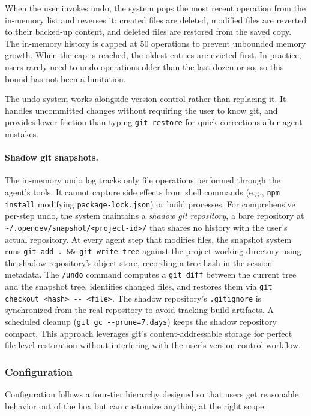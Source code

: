 When the user invokes undo, the system pops the most recent operation from the in-memory list and reverses it: created files are deleted, modified files are reverted to their backed-up content, and deleted files are restored from the saved copy. The in-memory history is capped at 50 operations to prevent unbounded memory growth. When the cap is reached, the oldest entries are evicted first. In practice, users rarely need to undo operations older than the last dozen or so, so this bound has not been a limitation.

The undo system works alongside version control rather than replacing it. It handles uncommitted changes without requiring the user to know git, and provides lower friction than typing \texttt{git restore} for quick corrections after agent mistakes.

\paragraph{Shadow git snapshots.} The in-memory undo log tracks only file operations performed through the agent's tools. It cannot capture side effects from shell commands (e.g., \texttt{npm install} modifying \texttt{package-lock.json}) or build processes. For comprehensive per-step undo, the system maintains a \emph{shadow git repository}, a bare repository at \texttt{\textasciitilde/.opendev/snapshot/<project-id>/} that shares no history with the user's actual repository. At every agent step that modifies files, the snapshot system runs \texttt{git add . \&\& git write-tree} against the project working directory using the shadow repository's object store, recording a tree hash in the session metadata. The \texttt{/undo} command computes a \texttt{git diff} between the current tree and the snapshot tree, identifies changed files, and restores them via \texttt{git checkout <hash> -{}- <file>}. The shadow repository's \texttt{.gitignore} is synchronized from the real repository to avoid tracking build artifacts. A scheduled cleanup (\texttt{git gc -{}-prune=7.days}) keeps the shadow repository compact. This approach leverages git's content-addressable storage for perfect file-level restoration without interfering with the user's version control workflow.

\subsubsection{Configuration}
\label{sec:configuration_persistence}

Configuration follows a four-tier hierarchy designed so that users get reasonable behavior out of the box but can customize anything at the right scope:

